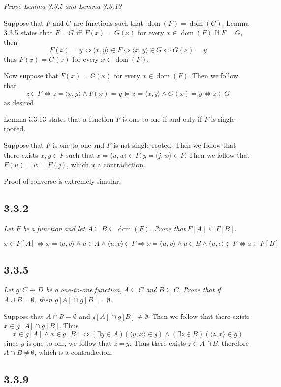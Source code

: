 \documentclass[11pt,oneside,titlepage]{book}
\DeclareMathOperator \lra {\Leftrightarrow}
\DeclareMathOperator \ra {\Rightarrow}
\DeclareMathOperator \dom {dom}
\newcommand{\eangle}[1]{\langle #1 \rangle}
\begin{document}
\textit{Prove Lemma 3.3.5 and Lemma 3.3.13}

Suppose that $F$ and $G$ are functions such that $\dom(F) = \dom(G)$. 
Lemma 3.3.5 states that $F = G$ iff $F(x) = G(x)$ for every $x \in \dom(F)$
If $F = G$, then
$$F(x) = y \lra \eangle{x, y} \in F \lra \eangle{x, y} \in G \lra G(x) = y$$
thus $F(x) = G(x)$ for every $x \in \dom(F)$.

Now suppose that $F(x) = G(x)$ for every $x \in \dom(F)$. Then we follow that
$$z \in F \lra z = \eangle{x, y} \land F(x) = y \lra
z = \eangle{x, y} \land G(x) = y \lra z \in G$$
as desired.

Lemma 3.3.13 states that a function $F$ is one-to-one if and only if $F$ is single-rooted.

Suppose that $F$ is one-to-one and $F$ is not single rooted. Then we follow that
there exists $x, y \in F$ such that $x = \eangle{u, w} \in F, y = \eangle{j, w} \in F$.
Then we follow that $F(u) = w = F(j)$, which is a contradiction.

Proof of converse is extremely simular.

\subsection*{3.3.2}

\textit{Let $F$ be a function and let $A \subseteq B \subseteq \dom(F)$. Prove that
  $F[A] \subseteq F[B]$.}

$$x \in F[A] \lra x = \eangle{u, v} \land u \in A \land \eangle{u, v} \in F \ra
x = \eangle{u, v} \land u \in B \land \eangle{u, v} \in F \lra x \in F[B]$$

\subsection*{3.3.5}

\textit{Let $g: C \to D$ be a one-to-one function, $A \subseteq C$ and $B \subseteq C$. Prove
  that if $A \cup B = \emptyset$, then $g[A] \cap g[B] = \emptyset$.}

Suppose that $A \cap B = \emptyset$ and $g[A] \cap g[B] \neq \emptyset$. Then we follow that
there exists $x \in g[A] \cap g[B]$. Thus
$$x \in g[A] \land x \in g[B] \lra (\exists y \in A)(\eangle{y, x} \in g) \land
(\exists z \in B)(\eangle{z, x} \in g)$$
since $g$ is one-to-one, we follow that $z = y$. Thus there exists $z \in A \cap B$, therefore
$A \cap B \neq \emptyset$, which is a contradiction.

\subsection*{3.3.9}
\end{document}
